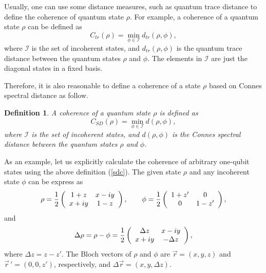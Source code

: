 \documentclass[a4paper,12pt]{article}
\newtheorem{definition}{Definition}
\begin{document}
Usually, one can use some distance measures, such as quantum trace distance\cite{Baumgratz,Shao} to define the coherence of quantum state $\rho$. For example,
a coherence of a quantum state $\rho$ can be defined as
\begin{equation}
	C_{tr}(\rho)=\min_{\phi\in\mathcal{I}}d_{tr}(\rho,\phi),
\end{equation}
where $\mathcal{I}$ is the set of incoherent states, and $d_{tr}(\rho,\phi)$ is the quantum trace distance between the quantum states $\rho$ and $\phi$. 
The elements in $\mathcal{I}$ are just the diagonal states in a fixed basis.

Therefore, it is also reasonable to define a coherence of a state $\rho$ based on Connes spectral distance as follow.
\begin{definition}
	A coherence of a quantum state $\rho$ is defined as
	\begin{equation}\label{sdc}
		C_{SD}(\rho)=\min_{\phi\in\mathcal{I}}d(\rho,\phi),
	\end{equation}
	where $\mathcal{I}$ is the set of incoherent states, and $d(\rho,\phi)$ is the Connes spectral distance between the quantum states $\rho$ and $\phi$. 
\end{definition}

As an example, let us explicitly calculate the coherence of arbitrary one-qubit states using the above definition (\ref{sdc}).
The given state $\rho$ and any incoherent state $\phi$ can be express as
\begin{equation}
	\rho=\frac{1}{2}\left(
	\begin{array}{cc}
		1+z & x-{\rm i}y \\
		x+{\rm i}y & 1-z \end{array}
	\right),
\qquad
	\phi
	=\frac{1}{2}\left(
	\begin{array}{cc}
		1+z' & 0 \\
		0 & 1-z' \end{array}
	\right),
\end{equation}
and
\begin{equation}
	\Delta\rho=\rho-\phi=\frac{1}{2}\left(
	\begin{array}{cc}
		\Delta z & x-{\rm i}y \\
		x+{\rm i}y & -\Delta z \end{array}
	\right),
\end{equation}
where $\Delta z=z-z'$.
The Bloch vectors of $\rho$ and $\phi$ are $\vec{r}=(x, y, z)$ and $\vec{r}\,'=(0, 0, z')$, respectively, and $\Delta\vec{r}=(x, y, \Delta z)$.
\end{document}
